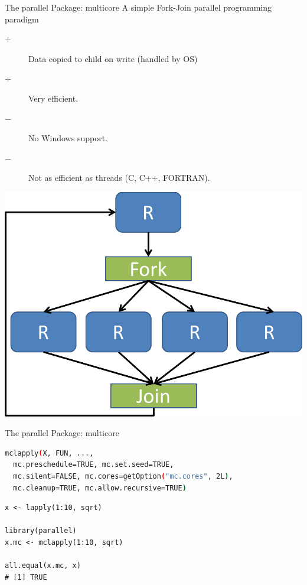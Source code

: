 \begin{frame}
  \begin{block}{The parallel Package: multicore}
    A simple Fork-Join parallel programming paradigm
    \begin{description}
    \item[+] Data copied to child on write (handled by OS)
    \item[+] Very efficient.
    \item[$-$] No Windows support.
    \item[$-$] Not as efficient as threads (C, C++, FORTRAN).
    \end{description}
  \end{block}
  \begin{center}
    \includegraphics[scale=.20]{../common/pics/parallel/forkjoin}
  \end{center}
\end{frame}


\begin{frame}[fragile]
  \begin{block}{The parallel Package: multicore}
\begin{lstlisting}[language=sh]
mclapply(X, FUN, ...,
  mc.preschedule=TRUE, mc.set.seed=TRUE,
  mc.silent=FALSE, mc.cores=getOption("mc.cores", 2L),
  mc.cleanup=TRUE, mc.allow.recursive=TRUE)
\end{lstlisting}
\begin{lstlisting}
x <- lapply(1:10, sqrt)

library(parallel)
x.mc <- mclapply(1:10, sqrt)

all.equal(x.mc, x)
# [1] TRUE
\end{lstlisting}
  \end{block}
\end{frame}



